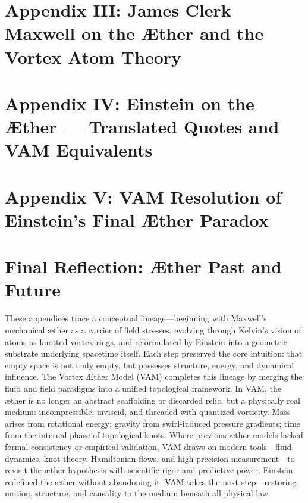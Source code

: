 \documentclass[entropy,article,submit,pdftex,oneauthor]{Definitions/mdpi}
\begin{document}
	\section*{Appendix III: James Clerk Maxwell on the Æther and the Vortex Atom Theory}
	\label{appendix:maxwell}
	

	\section*{Appendix IV: Einstein on the Æther — Translated Quotes and VAM Equivalents}
	\label{appendix:einstein}
	

	\section*{Appendix V: VAM Resolution of Einstein’s Final Æther Paradox}
	\label{appendix:final-aether}
	


	\section*{Final Reflection: Æther Past and Future}
	These appendices trace a conceptual lineage—beginning with Maxwell's mechanical æther as a carrier of field stresses, evolving through Kelvin's vision of atoms as knotted vortex rings, and reformulated by Einstein into a geometric substrate underlying spacetime itself. Each step preserved the core intuition: that empty space is not truly empty, but possesses structure, energy, and dynamical influence.
	The Vortex Æther Model (VAM) completes this lineage by merging the fluid and field paradigms into a unified topological framework. In VAM, the æther is no longer an abstract scaffolding or discarded relic, but a physically real medium: incompressible, inviscid, and threaded with quantized vorticity. Mass arises from rotational energy; gravity from swirl-induced pressure gradients; time from the internal phase of topological knots.
	Where previous æther models lacked formal consistency or empirical validation, VAM draws on modern tools—fluid dynamics, knot theory, Hamiltonian flows, and high-precision measurement—to revisit the æther hypothesis with scientific rigor and predictive power.
	Einstein redefined the æther without abandoning it. VAM takes the next step—restoring motion, structure, and causality to the medium beneath all physical law.
\end{document}
